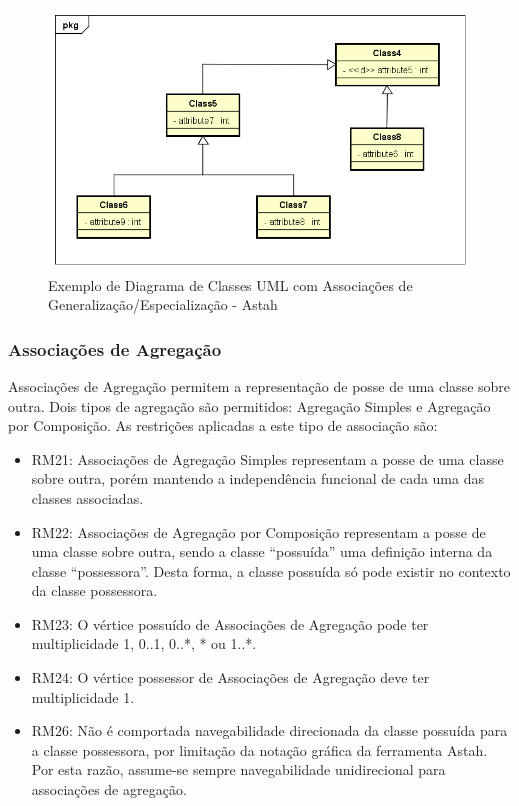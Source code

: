 \begin{figure}
    \begin{center}
        \includegraphics[scale=0.7]{imagens/Example_Realization.png}
    \end{center}
	\caption{\label{fig_example_realization}Exemplo de Diagrama de Classes UML com Associações de Generalização/Especialização - Astah}
\end{figure}


\subsubsection{Associações de Agregação}

Associações de Agregação permitem a representação de posse de uma classe sobre outra. Dois tipos de agregação são permitidos: Agregação Simples e Agregação por Composição. As restrições aplicadas a este tipo de associação são:

\begin{itemize}
    \item RM21: Associações de Agregação Simples representam a posse de uma classe sobre outra, porém mantendo a independência funcional de cada uma das classes associadas.

    \item RM22: Associações de Agregação por Composição representam a posse de uma classe sobre outra, sendo a classe ``possuída'' uma definição interna da classe ``possessora''. Desta forma, a classe possuída só pode existir no contexto da classe possessora.

    \item RM23: O vértice possuído de Associações de Agregação pode ter multiplicidade 1, 0..1, 0..*, * ou 1..*.

    \item RM24: O vértice possessor de Associações de Agregação deve ter multiplicidade 1.

    \item RM26: Não é comportada navegabilidade direcionada da classe possuída para a classe possessora, por limitação da notação gráfica da ferramenta Astah. Por esta razão, assume-se sempre navegabilidade unidirecional para associações de agregação.
\end{itemize}


